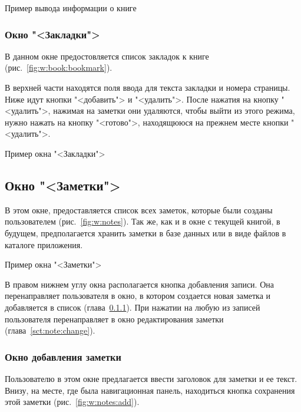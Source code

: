 \begin{image}
	\caption{Пример вывода информации о книге}
	\label{fig:w:book:info}
\end{image}

\subsubsection{Окно "<Закладки">}\label{sct:bookmark}
В данном окне предостовляется список закладок к книге
(рис.~\ref{fig:w:book:bookmark}).\par
В верхней части находятся поля ввода для текста закладки и номера страницы.
Ниже идут кнопки "<добавить"> и "<удалить">. После нажатия на кнопку
"<удалить">, нажимая на заметки они удаляются,
чтобы выйти из этого режима, нужно нажать на кнопку "<готово">,
находящююся на прежнем месте кнопки "<удалить">.

\begin{image}
	\caption{Пример окна "<Закладки">}
	\label{fig:w:book:bookmark}
\end{image}

\subsection{Окно "<Заметки">}
В этом окне, предоставляется список всех заметок, которые были
созданы пользователем (рис.~\ref{fig:w:notes}).
Так же, как и в окне с текущей книгой, в будущем, предполагается
хранить заметки в базе данных или в виде файлов в каталоге приложения.

\begin{image}
	\caption{Пример окна "<Заметки">}
	\label{fig:w:notes}
\end{image}

В правом нижнем углу окна располагается кнопка добавления записи.
Она перенаправляет пользователя в окно, в котором создается новая заметка
и добавляется в список (глава~\ref{sct:note:add}).
При нажатии на любую из записей пользователя
перенаправляет в окно редактирования заметки (глава~\ref{sct:note:change}).

\subsubsection{Окно добавления заметки}\label{sct:note:add}
Пользователю в этом окне предлагается ввести заголовок для заметки и
ее текст. Внизу, на месте, где была навигационная панель, находиться
кнопка сохранения этой заметки (рис.~\ref{fig:w:notes:add}).\par

